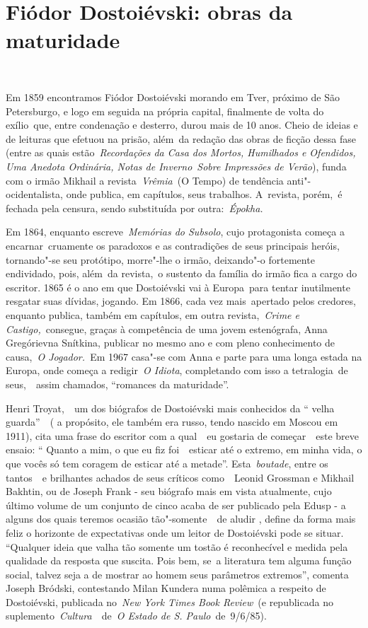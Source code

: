 ~

~

\section{Fiódor Dostoiévski: obras da maturidade}

~

Em 1859 encontramos Fiódor Dostoiévski morando em Tver, próximo de São
Petersburgo, e logo em seguida na própria capital, finalmente de volta
do exílio~que, entre condenação e desterro, durou mais de 10 anos. Cheio
de ideias e de leituras que efetuou na prisão, além~da redação das obras
de ficção dessa fase (entre as quais estão~\emph{Recordações da Casa dos
Mortos, Humilhados e Ofendidos, Uma Anedota Ordinária, Notas de
Inverno}~\emph{Sobre Impressões de Verão}), funda com o irmão Mikhail a
revista~\emph{Vrêmia}~(O Tempo) de tendência anti"-ocidentalista, onde
publica, em capítulos, seus trabalhos. A~revista, porém,~é fechada pela
censura, sendo substituída por outra:~\emph{Épokha.}

Em 1864, enquanto escreve~\emph{Memórias do Subsolo}, cujo protagonista
começa a encarnar~cruamente os paradoxos e as contradições de seus
principais heróis, tornando"-se seu protótipo, morre"-lhe o irmão,
deixando"-o fortemente endividado, pois, além~da revista,~o sustento da
família do irmão fica a cargo do escritor. 1865 é o ano em que
Dostoiévski vai à Europa~para tentar inutilmente resgatar suas dívidas,
jogando. Em 1866, cada vez mais~apertado pelos credores, enquanto
publica, também em capítulos, em outra revista,~\emph{Crime e
Castigo,}~consegue, graças à competência de uma jovem estenógrafa, Anna
Gregórievna Snítkina, publicar no mesmo ano e com pleno conhecimento de
causa,~\emph{O Jogador.~}Em 1967 casa"-se com Anna e parte para uma longa
estada na Europa, onde começa a redigir~\emph{O Idiota}, completando com
isso a tetralogia~de seus,~~assim chamados, ``romances da maturidade''.

Henri Troyat,~~um dos biógrafos de Dostoiévski mais conhecidos da ``
velha guarda''~~( a propósito, ele também era russo, tendo nascido em
Moscou em 1911), cita uma frase do escritor com a qual~~eu gostaria de
começar~~este breve ensaio: `` Quanto a mim, o que eu fiz foi~~esticar
até o extremo, em minha vida, o que vocês só tem coragem de esticar até
a metade''. Esta~\emph{boutade}, entre os tantos~~e brilhantes achados
de seus críticos como~~Leonid Grossman e Mikhail Bakhtin, ou de Joseph
Frank - seu biógrafo mais em vista atualmente, cujo último volume de um
conjunto de cinco acaba de ser publicado pela Edusp - a alguns dos quais
teremos ocasião tão"-somente~~de aludir , define da forma mais feliz o
horizonte de expectativas onde um leitor de Dostoiévski pode se situar.
``Qualquer ideia que valha tão somente um tostão é reconhecível e medida
pela qualidade da resposta que suscita. Pois bem, se~a literatura tem
alguma função social, talvez seja a de mostrar ao homem seus parâmetros
extremos'', comenta Joseph Bródski, contestando Milan Kundera numa
polêmica a respeito de Dostoiévski, publicada no~\emph{New York Times
Book Review}~(e republicada no suplemento~\emph{Cultura~}~de~\emph{O
Estado de S. Paulo}~de~9/6/85).

